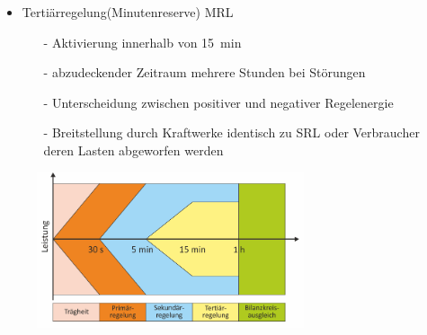 \documentclass[aspectratio=1610, professionalfonts, 9pt]{beamer}
\begin{document}
{
\begin{frame}
\begin{itemize}
\item Tertiärregelung(Minutenreserve) MRL
\begin{itemize}
  \item[-] Aktivierung innerhalb von \SI{15}{\minute}
  \item[-] abzudeckender Zeitraum mehrere Stunden bei Störungen
  \item[-] Unterscheidung zwischen positiver und negativer Regelenergie
  \item[-] Breitstellung durch Kraftwerke identisch zu SRL oder Verbraucher deren Lasten abgeworfen werden
\end{itemize}
\end{itemize}

  \begin{figure}
  \includegraphics[width=0.7\textwidth]{images/Regelleistung.png}
\end{figure}
\end{frame}
}
\end{document}
